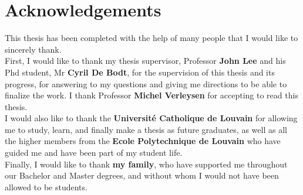 \section*{Acknowledgements}

This thesis has been completed with the help of many people that I would like to sincerely thank.\\ 

\noindent First, I would like to thank my thesis supervisor, Professor \textbf{John Lee} and his Phd student, Mr \textbf{Cyril De Bodt}, for the supervision of this thesis and its progress, for answering to my questions and giving me directions to be able to finalize the work. I thank Professor \textbf{Michel Verleysen} for accepting to read this thesis.\\

\noindent I would also like to thank the \textbf{Université Catholique de Louvain} for allowing me to study, learn, and finally make a thesis as future graduates, as well as all the higher members from the \textbf{Ecole Polytechnique de Louvain} who have guided me and have been part of my student life.\\

\noindent Finally, I would like to thank \textbf{my family}, who have supported me throughout our Bachelor and Master degrees, and without whom I would not have been allowed to be students.